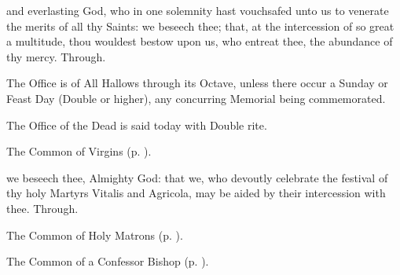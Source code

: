 \collect
{} and everlasting God, who in one solemnity hast vouchsafed unto us to venerate the merits of all thy Saints: we beseech thee; that, at the intercession of so great a multitude, thou wouldest bestow upon us, who entreat thee, the abundance of thy mercy. Through.

\begin{rubric}
	The Office is of All Hallows through its Octave, unless there occur a Sunday or Feast Day (Double or higher), any concurring Memorial being commemorated.
\end{rubric}


\label{AllSouls}

\begin{rubric}
	The Office of the Dead is said today with Double rite.
\end{rubric}



\begin{rubric}
	The Common of Virgins (p. \pageref{VirginMartyressesCollect}).
\end{rubric}



\memorialCollect
{} we beseech thee, Almighty God: that we, who devoutly celebrate the festival of thy holy Martyrs Vitalis and Agricola, may be aided by their intercession with thee. Through.



\begin{rubric}
	The Common of Holy Matrons (p. \pageref{CommonHolyMatronsCollect}).
\end{rubric}



\begin{rubric}
	The Common of a Confessor Bishop (p. \pageref{ConfessorBishopCollect}).
\end{rubric}



